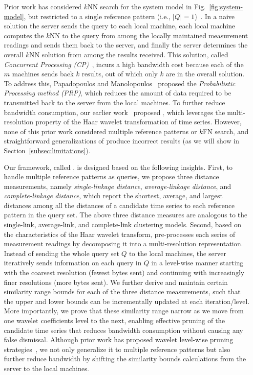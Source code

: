 Prior work has considered $k$NN search for the system model in Fig.~\ref{fig:system-model},
but restricted to a single reference pattern (i.e., $|Q|=1$)~\cite{PAP01DPS,Yeh:2008:LLD}.
In a naive solution the server sends the query to each local machine, each local machine computes
the $k$NN to the query from among the locally maintained measurement readings and sends
them back to the server, and finally the server determines the overall $k$NN solution
from among the results received.  This solution, called \textit{Concurrent Processing 
(CP)}~\cite{PAP01DPS}, incurs a high bandwidth cost because 
each of the $m$ machines sends back $k$ results, out of which only $k$ are in the overall
solution.  To address this, Papadopoulos and Manolopoulos~\cite{PAP01DPS} 
proposed the \textit{Probabilistic Processing method (PRP)}, which reduces the amount of data 
required to be transmitted back to the server from the local machines.
To further reduce bandwidth consumption, our earlier work~\cite{Yeh:2008:LLD} proposed
\LeeWave{}, which leverages the multi-resolution property of the Haar wavelet 
transformation of time series. However, none of this prior work considered multiple 
reference patterns or $k$FN search, and straightforward generalizations of \LeeWave{}
produce incorrect results (as we will show in Section~\ref{subsec:limitations}).

Our framework, called \MSWave{}, 
is designed based on the following insights. First, to
handle multiple reference patterns as queries, we propose three distance measurements, 
namely \emph{single-linkage distance}, \emph{average-linkage
distance}, and \emph{complete-linkage distance}, which report the
shortest, average, and largest distances among all the distances of a
candidate time series to each reference pattern in the query set. The above
three distance measures are analogous to the single-link, average-link, and
complete-link clustering models. Second, based on the characteristics
of the Haar wavelet transform, \MSWave{} pre-processes each series of measurement readings by
decomposing it into a multi-resolution representation. Instead of
sending the whole query set $Q$ to the local machines, the server
iteratively sends information on each query in $Q$ in a level-wise manner starting
with the coarsest resolution (fewest bytes sent) and continuing with increasingly finer 
resolutions (more bytes sent).
We further derive and
maintain certain similarity range bounds for each of the three
distance measurements, such that the upper and lower bounds can be incrementally
updated at each iteration/level.  More importantly, we prove that these similarity range
narrow as we move from one wavelet coefficients level to the next,
enabling effective pruning of the candidate time series that reduces bandwidth consumption
without causing any false dismissal.  Although prior work has proposed
wavelet level-wise pruning strategies~\cite{Yeh:2008:LLD, Kashyap:2011:SKS},
we not only generalize it to multiple reference patterns but also further reduce
bandwidth by shifting the similarity bounds calculations from the server
to the local machines.  

